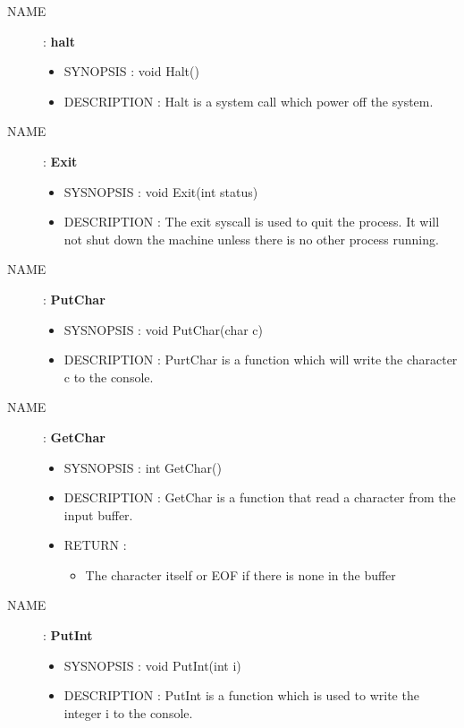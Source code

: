 \documentclass[a4paper,10pt]{article}
\begin{document}
\begin{description}
    \item [NAME] : \textbf{halt}
        \begin{itemize}
            \item SYNOPSIS : void Halt()
            \item DESCRIPTION :
                Halt is a system call which power off the system.
        \end{itemize}


    \item [NAME] : \textbf{Exit}
        \begin{itemize}
            \item SYSNOPSIS : void Exit(int status)
            \item DESCRIPTION :
                The exit syscall is used to quit the process. It will not shut down the
                machine unless there is no other process running.
        \end{itemize}

    \item [NAME] : \textbf{PutChar}
        \begin{itemize}
            \item SYSNOPSIS : void PutChar(char c)
            \item DESCRIPTION :
                PurtChar is a function which will write the character c to the console.
        \end{itemize}

    \item [NAME] : \textbf{GetChar}
        \begin{itemize}
            \item SYSNOPSIS : int GetChar()
            \item DESCRIPTION :
                GetChar is a function that read a character from the input buffer.
            \item RETURN :
                \begin{itemize}
                    \item The character itself or EOF if there is none in the buffer
                \end{itemize}
        \end{itemize}

    \item [NAME] : \textbf{PutInt}
        \begin{itemize}
            \item SYSNOPSIS : void PutInt(int i)
            \item DESCRIPTION :
                PutInt is a function which is used to write the integer i to the console.
        \end{itemize}


\end{description}
\end{document}
